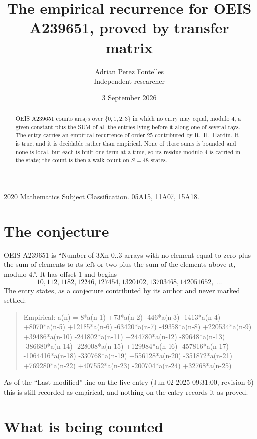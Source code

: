 \documentclass[11pt,a4paper]{article}
\title{The empirical recurrence for OEIS A239651, proved by transfer matrix}
\author{Adrian Perez Fontelles\\ \small Independent researcher}
\date{3 September 2026}
\theoremstyle{plain}
\theoremstyle{definition}
\begin{document}
\maketitle

\begin{abstract}
OEIS A239651 counts arrays over $\{0,1,2,3\}$ in which no entry may equal, modulo $4$, a given
constant plus the SUM of all the entries lying before it along one of several rays. The entry
carries an empirical recurrence of order $25$ contributed by R.~H.~Hardin. It is true, and
it is decidable rather than empirical. None of those sums is bounded and none is local, but
each is built one term at a time, so its residue modulo $4$ is carried in the state; the
count is then a walk count on $S=48$ states.
\end{abstract}

\noindent\small 2020 Mathematics Subject Classification. 05A15, 11A07, 15A18.\normalsize

\section{The conjecture}

OEIS A239651 is ``Number of 3Xn 0..3 arrays with no element equal to zero plus the sum of elements to its left or two plus the sum of the elements above it, modulo 4.''. It has offset $1$ and begins
\[
10, 112, 1182, 12246, 127454, 1320102, 13703468, 142051652,\ \dots
\]
The entry states, as a conjecture contributed by its author and never marked settled:
\begin{quote}
Empirical: a(n) = 8*a(n-1) +73*a(n-2) -446*a(n-3) -1413*a(n-4) +8070*a(n-5) +12185*a(n-6) -63420*a(n-7) -49358*a(n-8) +220534*a(n-9) +39486*a(n-10) -241802*a(n-11) +244780*a(n-12) -89648*a(n-13) -386680*a(n-14) -228008*a(n-15) +129984*a(n-16) -457816*a(n-17) -1064416*a(n-18) -330768*a(n-19) +556128*a(n-20) -351872*a(n-21) +769280*a(n-22) +407552*a(n-23) -200704*a(n-24) +32768*a(n-25)
\end{quote}
As of the ``Last modified'' line on the live entry (Jun 02 2025 09:31:00, revision 6) this is still
recorded as empirical, and nothing on the entry records it as proved.

\section{What is being counted}
\end{document}
